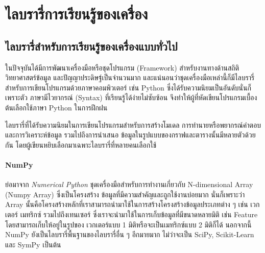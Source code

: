 

\section{ไลบรารี่การเรียนรู้ของเครื่อง}
\label{ap:library_ml}

\subsection{ไลบรารี่สำหรับการเรียนรู้ของเครื่องแบบทั่วไป}
\label{ssec:lib_ml}

ในปัจจุบันได้มีการพัฒนาเครื่องมือหรือชุดโปรแกรม (Framework) สำหรับงานทางด้านสถิติ วิทยาศาสตร์ข้อมูล และปัญญาประดิษฐ์เป็นจำนวนมาก
และแน่นอนว่าชุดเครื่องมือเหล่านี้ก็มีไลบรารี่สำหรับการเขียนโปรแกรมด้วยภาษาคอมพิวเตอร์ เช่น Python ซึ่งได้รับความนิยมเป็นอันดับนั่นก็เพราะตัว%
ภาษามีไวยากรณ์ (Syntax) ที่เรียนรู้ได้ง่ายไม่ซับซ้อน จึงทำให้ผู้ที่หัดเขียนโปรแกรมเบื้องต้นเลือกใช้ภาษา Python ในการฝึกฝน 

ไลบรารี่ที่ได้รับความนิยมในการเขียนโปรแกรมสำหรับการสร้างโมเดล การทำนายหรือพยากรณ์คำตอบ และการวิเคราะห์ข้อมูล รวมไปถึงการนำเสนอ%
ข้อมูลในรูปแบบของกราฟและตารางนั้นมีหลายตัวด้วยกัน โดยผู้เขียนหยิบเลือกมาเฉพาะไลบรารี่ที่หลายคนเลือกใช้

\paragraph{\textbf{NumPy}}
ย่อมาจาก \textit{Numerical Python} ชุดเครื่องมือสำหรับการทำงานเกี่ยวกับ N-dimensional Array (Numpy Array) ซึ่งเป็นโครงสร้าง%
ข้อมูลที่มีความสำคัญและถูกใช้งานบ่อยมาก นั่นก็เพราะว่า Array นั้นคือโครงสร้างหลักที่เราสามารถนำมาใช้ในการสร้างโครงสร้างข้อมูลประเภทต่าง ๆ 
เช่น เวกเตอร์ เมทริกซ์ รวมไปถึงเทนเซอร์ ซึ่งเราจะนำมาใช้ในการเก็บข้อมูลที่มีขนาดหลายมิติ เช่น Feature โดยสามารถเก็บให้อยู่ในรูปของ%
เวกเตอร์แบบ 1 มิติหรือจะเป็นเมทริกซ์แบบ 2 มิติก็ได้ นอกจากนี้ NumPy ยังเป็นไลบรารี่พื้นฐานของไลบรารี่อื่น ๆ อีกมายมาก ไม่ว่าจะเป็น SciPy, 
Scikit-Learn และ SymPy เป็นต้น

